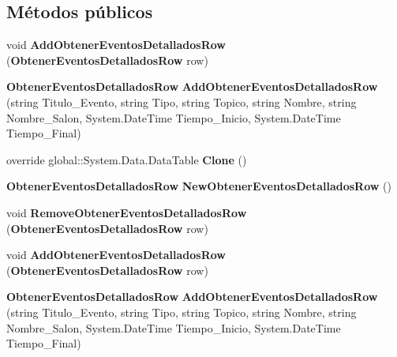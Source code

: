 \subsection*{Métodos públicos}
\begin{DoxyCompactItemize}
\item 
void {\bfseries Add\+Obtener\+Eventos\+Detallados\+Row} ({\bf Obtener\+Eventos\+Detallados\+Row} row)\label{class_resa___pro_1_1_resa_d_b_data_set_1_1_obtener_eventos_detallados_data_table_a198f3ddfe6c1b635638ef9c879df3ad2}

\item 
{\bf Obtener\+Eventos\+Detallados\+Row} {\bfseries Add\+Obtener\+Eventos\+Detallados\+Row} (string Titulo\+\_\+\+Evento, string Tipo, string Topico, string Nombre, string Nombre\+\_\+\+Salon, System.\+Date\+Time Tiempo\+\_\+\+Inicio, System.\+Date\+Time Tiempo\+\_\+\+Final)\label{class_resa___pro_1_1_resa_d_b_data_set_1_1_obtener_eventos_detallados_data_table_a0fc2b88bcfe3f863327e9bd491bcc15b}

\item 
override global\+::\+System.\+Data.\+Data\+Table {\bfseries Clone} ()\label{class_resa___pro_1_1_resa_d_b_data_set_1_1_obtener_eventos_detallados_data_table_ae9642f6af12f7189be4d344f5cb4dce1}

\item 
{\bf Obtener\+Eventos\+Detallados\+Row} {\bfseries New\+Obtener\+Eventos\+Detallados\+Row} ()\label{class_resa___pro_1_1_resa_d_b_data_set_1_1_obtener_eventos_detallados_data_table_a31dc7ef15b8728b9bada4e8f76faa34d}

\item 
void {\bfseries Remove\+Obtener\+Eventos\+Detallados\+Row} ({\bf Obtener\+Eventos\+Detallados\+Row} row)\label{class_resa___pro_1_1_resa_d_b_data_set_1_1_obtener_eventos_detallados_data_table_ac310860831093b380da2193a991dc9a7}

\item 
void {\bfseries Add\+Obtener\+Eventos\+Detallados\+Row} ({\bf Obtener\+Eventos\+Detallados\+Row} row)\label{class_resa___pro_1_1_resa_d_b_data_set_1_1_obtener_eventos_detallados_data_table_a198f3ddfe6c1b635638ef9c879df3ad2}

\item 
{\bf Obtener\+Eventos\+Detallados\+Row} {\bfseries Add\+Obtener\+Eventos\+Detallados\+Row} (string Titulo\+\_\+\+Evento, string Tipo, string Topico, string Nombre, string Nombre\+\_\+\+Salon, System.\+Date\+Time Tiempo\+\_\+\+Inicio, System.\+Date\+Time Tiempo\+\_\+\+Final)\label{class_resa___pro_1_1_resa_d_b_data_set_1_1_obtener_eventos_detallados_data_table_a0fc2b88bcfe3f863327e9bd491bcc15b}


\end{DoxyCompactItemize}
